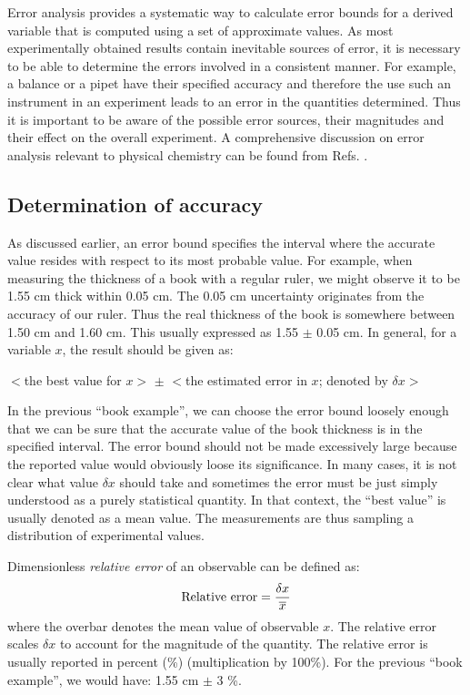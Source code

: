 \documentclass[byrevtex,amssymb,aps,pra,floatfix,letterpaper]{revtex4}
\begin{document}
Error analysis provides a systematic way to calculate error bounds for a derived variable that is computed using a set of approximate values. As most experimentally obtained results contain inevitable sources of error, it is necessary to be able to determine the errors involved in a consistent manner. For example, a balance or a pipet have their specified accuracy and therefore the use such an instrument in an experiment leads to an error in the quantities determined. Thus it is important to be aware of the possible error sources, their magnitudes and their effect on the overall experiment. A comprehensive discussion on error analysis relevant to physical chemistry can be found from Refs. \cite{MCBANE,TAYLOR}.

\subsection{Determination of accuracy}

As discussed earlier, an error bound specifies the interval where the accurate value resides with respect to its most probable value. For example, when measuring the thickness of a book with a regular ruler, we might observe it to be 1.55 cm thick within 0.05 cm. The 0.05 cm uncertainty originates from the accuracy of our ruler. Thus the real thickness of the book is somewhere between 1.50 cm and 1.60 cm. This usually expressed as 1.55 $\pm$ 0.05 cm. In general, for a variable $x$, the result should be given as:

\begin{center}
$<$the best value for $x>$ $\pm$ $<$the estimated error in $x$; denoted by $\delta x>$
\end{center}

\noindent
In the previous ``book example'', we can choose the error bound loosely enough that we can be sure that the accurate value of the book thickness is in the specified interval. The error bound should not be made excessively large because the reported value would obviously loose its significance. In many cases, it is not clear what value $\delta x$ should take and sometimes the error must be just simply understood as a purely statistical quantity. In that context, the ``best value'' is usually denoted as a mean value. The measurements are thus sampling a distribution of experimental values.

Dimensionless \textit{relative error} of an observable can be defined as:
\begin{equation}
\label{eq1}
\textnormal{Relative error} = \frac{\delta x}{\overline{x}}
\end{equation}
where the overbar denotes the mean value of observable $x$. The relative error scales $\delta x$ to account for the magnitude of the quantity. The relative error is usually reported in percent (\%) (multiplication by 100\%). For the previous ``book example'', we would have: 1.55 cm $\pm$ 3 \%.
\end{document}
